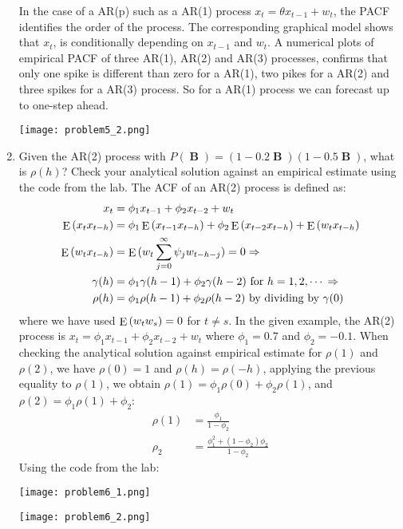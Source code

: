 \documentclass{article}
\DeclareMathOperator*{\E}{\rm E}
\DeclareMathOperator*{\B}{\textbf{B}}
\newcommand{\0}{\mat{0}}
\newenvironment{solution}{\vspace{.25cm}\noindent{\it Solution:}}{}
\begin{document}
\begin{enumerate}
\begin{solution}
	In the case of a AR(p) such as a AR(1) process $x_t = \theta x_{t-1} + w_t$, the PACF identifies the order of the process. The corresponding graphical model shows that  $x_t$, is conditionally depending 
	on $x_{t-1}$ and $w_t$. A numerical plots of empirical PACF of three AR(1), AR(2) and AR(3) processes, confirms that only one spike is different than zero for a AR(1), two pikes for a AR(2) and three spikes for a AR(3) process.
	So for a AR(1) process we can forecast up to one-step ahead.
	
	\begin{center}
		\texttt{[image: problem5\_2.png]} 
	\end{center}

	
	\item Given the AR(2) process with $P(\B) = (1-0.2 \B) (1-0.5 \B)$, what is $\rho(h)$? Check your analytical solution against an empirical estimate using the code from the lab. 
	The ACF of an AR(2) process is defined as:
	\begin{align*}
		x_t			&= \phi_1 x_{t-1} + \phi_2 x_{t-2} + w_t \\
		\E{(x_t x_{t-h})}	&=  \phi_1 \E{(x_{t-1} x_{t-h})} + \phi_2 \E{(x_{t-2} x_{t-h})} + \E{(w_t   x_{t-h})}\\
		\E{(w_t x_{t-h})}	&= \E{(w_t \sum_{j=0}^\infty \psi_j  w_{t-h-j}) = 0}  \Rightarrow \\	
		\gamma(h) 	&= \phi_1 \gamma(h-1) + \phi_2  \gamma(h-2) \text{ for $h=1,2,\cdots$} \Rightarrow\\
		\rho(h) 		&= \phi_1 \rho(h-1) +  \phi_2  \rho(h-2) \text{ by dividing by $\gamma(0)$}
	\end{align*}
	where we have used $\E{(w_t w_s)} = 0$ for $t \ne s$.		
	In the given example, the AR(2) process is $x_t = \phi_1 x_{t-1} + \phi_2 x_{t-2} + w_t$ where $\phi_1 = 0.7$ and $\phi_2 = -0.1$.
	When checking the analytical solution against empirical estimate for $\rho(1)$ and $\rho(2)$, we have
	$\rho(0)=1$ and $\rho(h) = \rho(-h)$, applying the previous equality to $\rho(1)$, we obtain $\rho(1) = \phi_1 \rho(0) + \phi_2 \rho(1)$, and $\rho(2) = \phi_1 \rho(1) + \phi_2$:
	\begin{align*}
			\rho(1) 	&= \frac{\phi_1}{1-\phi_2} \\
			\rho_2	&= \frac{\phi_1^2 + (1-\phi_2) \phi_2}{1-\phi_2}
	\end{align*}
	Using the code from the lab:
	\begin{center}
		\texttt{[image: problem6\_1.png]} 
	\end{center}
	\begin{center}
		\texttt{[image: problem6\_2.png]} 
	\end{center}
	
	\end{solution}
\end{enumerate}
\end{document}
